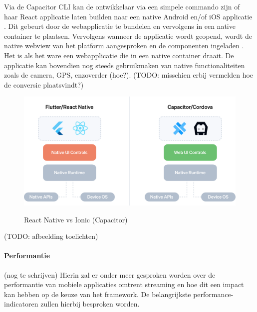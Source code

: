 Via de Capacitor CLI kan de ontwikkelaar via een simpele commando zijn of haar React applicatie laten builden naar een native Android en/of iOS applicatie \autocite{Bron21}. Dit gebeurt door de webapplicatie te bundelen en vervolgens in een native container te plaatsen. Vervolgens wanneer de applicatie wordt geopend, wordt de native webview van het platform aangesproken en de componenten ingeladen \autocite{Bron19}. Het is als het ware een webapplicatie die in een native container draait. De applicatie kan bovendien nog steeds gebruikmaken van native functionaliteiten zoals de camera, GPS, enzoverder (hoe?). (TODO: misschien erbij vermelden hoe de conversie plaatsvindt?)




\begin{figure}
  \centering
  \includegraphics[width=0.9\linewidth]{img/ReactIonic}
  \caption{React Native vs Ionic (Capacitor)}
  \label{fig:React Native vs Ionic (Capacitor)} \autocite{Bron19IMG}
\end{figure}



(TODO: afbeelding toelichten)
\paragraph{Performantie}

(nog te schrijven)
Hierin zal er onder meer gesproken worden over de performantie van mobiele applicaties omtrent streaming en hoe dit een impact kan hebben op de keuze van het framework. De belangrijkste performance-indicatoren zullen hierbij besproken worden.

